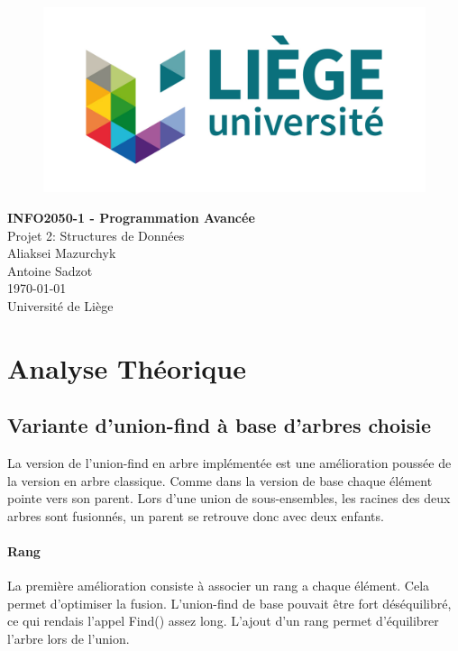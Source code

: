 \documentclass[11pt]{article}
\begin{document}
\begin{titlepage}

   \begin{figure}[htbp]
      \centering
      \includegraphics{uliege-logo-couleurs-300.jpg}
   \end{figure}
  	
  	\hfill

	\begin{center}
		\vfill
		\textbf{
		\Huge{INFO2050-1 - Programmation Avancée}}\\
		\bigskip
		\huge{Projet 2: Structures de Données}\\
		\bigskip %
		\smallskip
		\Large{Aliaksei Mazurchyk\\Antoine Sadzot}\\
		\bigskip
		\smallskip
		\large{\today}\\%
		\vfill
		\large{Université de Liège}
	\end{center}
\end{titlepage}
\clearpage
\clearpage

\section{Analyse Théorique}
\subsection{Variante d'union-find à base d'arbres choisie}
	La version de l'union-find en arbre implémentée est une amélioration poussée de la version en arbre classique. Comme dans la version de base chaque élément pointe vers son parent.
	Lors d'une union de sous-ensembles, les racines des deux arbres sont fusionnés, un parent se retrouve donc avec deux enfants.
	
	\paragraph{Rang}			
	La première amélioration consiste à associer un rang a chaque élément. Cela permet d'optimiser la fusion. L'union-find de base pouvait être fort déséquilibré, ce qui rendais l'appel Find() assez long. L'ajout d'un rang permet d'équilibrer l'arbre lors de l'union. 
	
\end{document}
